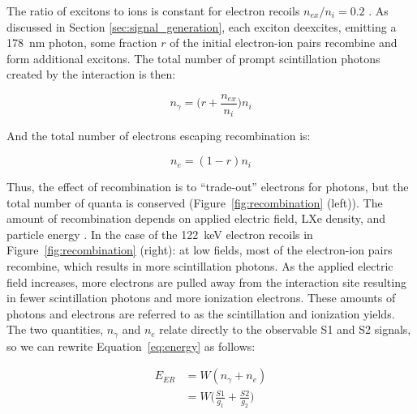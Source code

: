 The ratio of excitons to ions is constant for electron recoils $n_{ex}/{n_{i}} = 0.2$ \cite{LUX:YieldsAndRecombination}. As discussed in Section \ref{sec:signal_generation}, each exciton deexcites, emitting a 178~nm photon, some fraction $r$ of the initial electron-ion pairs recombine and form additional excitons. The total number of prompt scintillation photons created by the interaction is then:

\begin{equation}
n_{\gamma} = \Big(r + \frac{n_{ex}}{n_{i}} \Big) n_{i}
\end{equation}

And the total number of electrons escaping recombination is:

\begin{equation}
n_{e} = (1 - r ) n_{i}
\end{equation}

Thus, the effect of recombination is to ``trade-out'' electrons for photons, but the total number of quanta is conserved (Figure~\ref{fig:recombination} (left)). The amount of recombination depends on applied electric field, \ac{LXe} density, and particle energy \cite{LUX:YieldsAndRecombination}. In the case of the 122~keV electron recoils in Figure~\ref{fig:recombination} (right): at low fields, most of the electron-ion pairs recombine, which results in more scintillation photons. As the applied electric field increases, more electrons are pulled away from the interaction site resulting in fewer scintillation photons and more ionization electrons. These amounts of photons and electrons are referred to as the scintillation and ionization yields. The two quantities, $n_{\gamma}$  and $n_{e}$ relate directly to the observable S1 and S2 signals, so we can rewrite Equation~\ref{eq:energy} as follows:

\begin{equation}
\label{eq:energy}
\begin{split}
E_{ER} &= W (n_{\gamma} + n_{e} ) \\
   &= W \Big(\frac{S1}{g_{1}} + \frac{S2}{g_{2}} \Big)
\end{split}
\end{equation}

